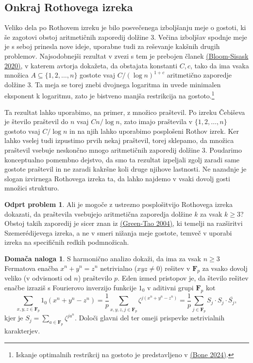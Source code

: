 \documentclass[11pt]{book}
\def\FF{\mathbf{F}}
\theoremstyle{definition}
\theoremstyle{zgled}
\theoremstyle{zgledbrezstevilke}
\theoremstyle{odprtproblem}
\newtheorem{odprtproblem}[theorem]{Odprt problem}
\theoremstyle{domacanaloga}
\newtheorem{domacanaloga}[theorem]{Domača naloga}
\theoremstyle{izrek}
\begin{document}
\subsection{Onkraj Rothovega izreka}

Veliko dela po Rothovem izreku je bilo posvečenega izboljšanju meje o gostoti, ki še zagotovi obstoj aritmetičnih zaporedij dolžine $3$. Večina izboljšav spodnje meje je s seboj prinesla nove ideje, uporabne tudi za reševanje kakšnih drugih problemov. Najsodobnejši rezultat v zvezi s tem je prebojen članek \href{https://www.quantamagazine.org/landmark-math-proof-clears-hurdle-in-top-erdos-conjecture-20200803/}{(Bloom-Sisask 2020)}, v katerem avtorja dokažeta, da obstajata konstanti $C,c$, tako da ima vsaka množica $A \subseteq \{ 1, 2, \dots, n \}$ gostote vsaj $C / (\log n)^{1 + c}$ aritmetično zaporedje dolžine $3$. Ta meja se torej znebi dvojnega logaritma in uvede minimalen eksponent k logaritmu, zato je bistveno manjša restrikcija na gostoto.\footnote{Iskanje optimalnih restrikcij na gostoto je predstavljeno v \href{https://repozitorij.uni-lj.si/IzpisGradiva.php?id=155586&lang=slv}{(Bone 2024)}.}

Ta rezultat lahko uporabimo, na primer, z množico praštevil. Po izreku Čebiševa je število praštevil do $n$ vsaj $C n / \log n$, zato imajo praštevila v $\{1,2,\dots,n\}$ gostoto vsaj $C / \log n$ in na njih lahko uporabimo posplošeni Rothov izrek. Ker lahko vselej tudi izpustimo prvih nekaj praštevil, torej sklepamo, da množica praštevil vsebuje neskončno mnogo aritmetičnih zaporedij dolžine $3$. Poudarimo konceptualno pomembno dejstvo, da smo ta rezultat izpeljali zgolj zaradi same gostote praštevil in ne zaradi kakršne koli druge njihove lastnosti. Ne nazadnje je slogan izvirnega Rothovega izreka ta, da lahko najdemo v vsaki dovolj gosti množici strukturo.

\begin{odprtproblem}
Ali je mogoče z ustrezno posplošitvijo Rothovega izreka dokazati, da praštevila vsebujejo aritmetična zaporedja dolžine $k$ za vsak $k \geq 3$? Obstoj takih zaporedij je sicer znan iz \href{https://en.wikipedia.org/wiki/Green–Tao_theorem}{(Green-Tao 2004)}, ki temelji na razširitvi Szemerédijevega izreka, a ne v smeri nižanja meje gostote, temveč v uporabi izreka na specifičnih redkih podmnožicah.
\end{odprtproblem}

\begin{domacanaloga}
S harmonično analizo dokaži, da ima za vsak $n \geq 3$ Fermatova enačba $x^n + y^n = z^n$ netrivialno ($xyz \neq 0$) rešitev v $\FF_p$ za vsako dovolj veliko (v odvisnosti od $n$) praštevilo $p$. Eden izmed pristopov je, da število rešitev enačbe izraziš s Fourierovo inverzijo funkcije $1_0$ v aditivni grupi $\FF_p$ kot
\[
    \sum_{x,y,z \in \FF_p} 1_{0}(x^n + y^n - z^n)
    = \frac{1}{p} \sum_{x, y, z, j \in \FF_p} \zeta^{j(x^n + y^n - z^n)}
    = \frac{1}{p} \sum_{j \in \FF_p} S_j \cdot S_j \cdot \overline{S_j},
\]
kjer je $S_j = \sum_{a \in \FF_p} \zeta^{j a^n}$. Določi glavni del ter omeji prispevke netrivialnih karakterjev.
\end{domacanaloga}
\end{document}
